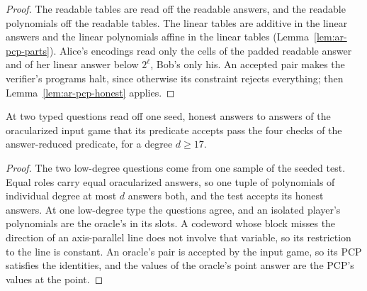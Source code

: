 \begin{proof}
\leanok
The readable tables are read off the readable answers, and the readable polynomials off the
readable tables. The linear tables are additive in the linear answers and the linear polynomials
affine in the linear tables (Lemma~\ref{lem:ar-pcp-parts}). Alice's encodings read only the cells
of the padded readable answer and of her linear answer below $2^\ell$, Bob's only his. An accepted
pair makes the verifier's programs halt, since otherwise its constraint rejects everything; then
Lemma~\ref{lem:ar-pcp-honest} applies.
\end{proof}

\begin{lemma}
\label{lem:ar-honest-checks}
\leanok
At two typed questions read off one seed, honest answers to answers of the oracularized input game
that its predicate accepts pass the four checks of the answer-reduced predicate, for a degree
$d \geq 17$.
\end{lemma}

\begin{proof}
\leanok
The two low-degree questions come from one sample of the seeded test. Equal roles carry equal
oracularized answers, so one tuple of polynomials of individual degree at most $d$ answers both,
and the test accepts its honest answers. At one low-degree type the questions agree, and an
isolated player's polynomials are the oracle's in its slots. A codeword whose block misses the
direction of an axis-parallel line does not involve that variable, so its restriction to the line
is constant. An oracle's pair is accepted by the input game, so its PCP satisfies the identities,
and the values of the oracle's point answer are the PCP's values at the point.
\end{proof}

